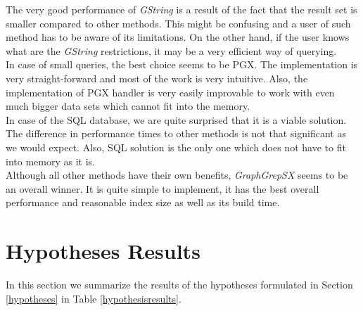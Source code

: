 The very good performance of \textit{GString} is a result of the fact that the result set is smaller compared to other methods. This might be confusing and a user of such method has to be aware of its limitations. On the other hand, if the user knows what are the \textit{GString} restrictions, it may be a very efficient way of querying.\\

In case of small queries, the best choice seems to be PGX. The implementation is very straight-forward and most of the work is very intuitive. Also, the implementation of PGX handler is very easily improvable to work with even much bigger data sets which cannot fit into the memory.\\

In case of the SQL database, we are quite surprised that it is a viable solution. The difference in performance times to other methods is not that significant as we would expect. Also, SQL solution is the only one which does not have to fit into memory as it is.\\

Although all other methods have their own benefits, \textit{GraphGrepSX} seems to be an overall winner. It is quite simple to implement, it has the best overall performance and reasonable index size as well as its build time.

\section{Hypotheses Results}
In this section we summarize the results of the hypotheses formulated in Section \ref{hypotheses} in Table \ref{hypothesisresults}.

